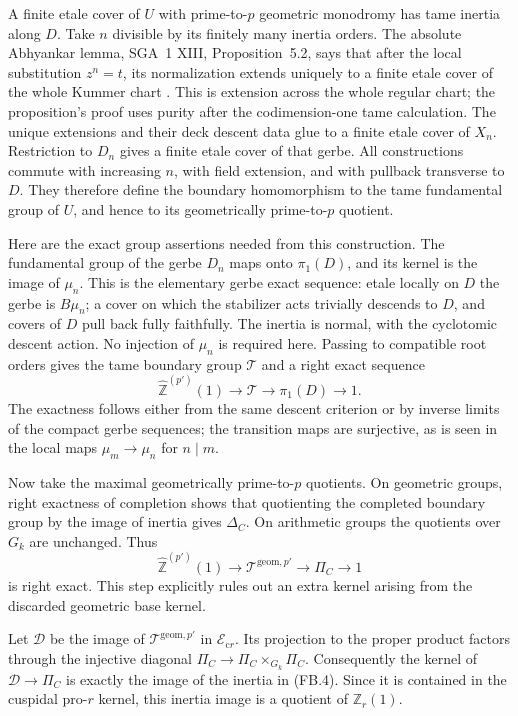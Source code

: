 A finite etale cover of \(U\) with prime-to-\(p\)
geometric monodromy has tame inertia along \(D\).
Take \(n\) divisible by its finitely many inertia
orders. The absolute Abhyankar lemma, SGA~1 XIII,
Proposition~5.2, says that after the local substitution
\(z^n=t\), its normalization extends uniquely to a
finite etale cover of the whole Kummer chart
\cite{AR_SGA1}. This is extension across the whole
regular chart; the proposition's proof uses purity
after the codimension-one tame calculation.
The unique extensions and their deck
descent data glue to a finite etale cover of \(X_n\).
Restriction to \(D_n\) gives a finite etale cover of
that gerbe. All constructions commute with increasing
\(n\), with field extension, and with pullback
transverse to \(D\). They therefore define the boundary
homomorphism to the tame fundamental group of \(U\),
and hence to its geometrically prime-to-\(p\) quotient.

Here are the exact group assertions needed from this
construction. The fundamental group of the gerbe \(D_n\)
maps onto \(\pi_1(D)\), and its kernel is the image
of \(\mu_n\). This is the elementary gerbe exact
sequence: etale locally on \(D\) the gerbe is
\(B\mu_n\); a cover on which the stabilizer acts
trivially descends to \(D\), and covers of \(D\)
pull back fully faithfully. The inertia is normal,
with the cyclotomic descent action. No injection of
\(\mu_n\) is required here. Passing to compatible
root orders gives the tame boundary group \(\mathcal T\)
and a right exact sequence
\[
 \widehat{\mathbb Z}^{(p')}(1)\longrightarrow\mathcal T
              \longrightarrow\pi_1(D)\longrightarrow1.
                                                        \tag{FB.3}
\]
The exactness follows either from the same descent
criterion or by inverse limits of the compact gerbe
sequences; the transition maps are surjective, as is
seen in the local maps \(\mu_m\to\mu_n\) for
\(n\mid m\).

Now take the maximal geometrically prime-to-\(p\)
quotients. On geometric groups, right exactness of
completion shows that quotienting the completed
boundary group by the image of inertia gives
\(\Delta_C\). On arithmetic groups the quotients
over \(G_k\) are unchanged. Thus
\[
 \widehat{\mathbb Z}^{(p')}(1)\longrightarrow
 \mathcal T^{\mathrm{geom},p'}\longrightarrow
 \Pi_C\longrightarrow1                             \tag{FB.4}
\]
is right exact. This step explicitly rules out an extra
kernel arising from the discarded geometric base kernel.

Let \(\mathcal D\) be the image of
\(\mathcal T^{\mathrm{geom},p'}\) in
\(\mathcal E_{\mathrm{c}r}\). Its projection to the
proper product factors through the injective diagonal
\(\Pi_C\to\Pi_C\times_{G_k}\Pi_C\).
Consequently the kernel of \(\mathcal D\to\Pi_C\)
is exactly the image of the inertia in (FB.4).
Since it is contained in the cuspidal pro-\(r\) kernel,
this inertia image is a quotient of \(\mathbb Z_r(1)\).

